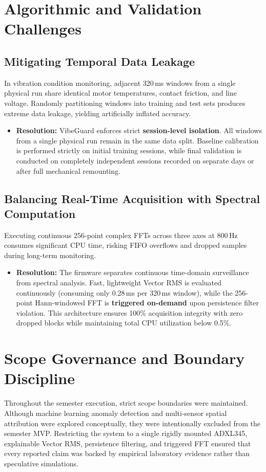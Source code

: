 \section{Algorithmic and Validation Challenges}
\subsection{Mitigating Temporal Data Leakage}
In vibration condition monitoring, adjacent 320\,ms windows from a single physical run share identical motor temperatures, contact friction, and line voltage. Randomly partitioning windows into training and test sets produces extreme data leakage, yielding artificially inflated accuracy.
\begin{itemize}
    \item \textbf{Resolution:} VibeGuard enforces strict \textbf{session-level isolation}. All windows from a single physical run remain in the same data split. Baseline calibration is performed strictly on initial training sessions, while final validation is conducted on completely independent sessions recorded on separate days or after full mechanical remounting.
\end{itemize}

\subsection{Balancing Real-Time Acquisition with Spectral Computation}
Executing continuous 256-point complex FFTs across three axes at 800\,Hz consumes significant CPU time, risking FIFO overflows and dropped samples during long-term monitoring.
\begin{itemize}
    \item \textbf{Resolution:} The firmware separates continuous time-domain surveillance from spectral analysis. Fast, lightweight Vector RMS is evaluated continuously (consuming only 0.28\,ms per 320\,ms window), while the 256-point Hann-windowed FFT is \textbf{triggered on-demand} upon persistence filter violation. This architecture ensures 100\% acquisition integrity with zero dropped blocks while maintaining total CPU utilization below 0.5\%.
\end{itemize}

\section{Scope Governance and Boundary Discipline}
Throughout the semester execution, strict scope boundaries were maintained. Although machine learning anomaly detection and multi-sensor spatial attribution were explored conceptually, they were intentionally excluded from the semester MVP. Restricting the system to a single rigidly mounted ADXL345, explainable Vector RMS, persistence filtering, and triggered FFT ensured that every reported claim was backed by empirical laboratory evidence rather than speculative simulations.

